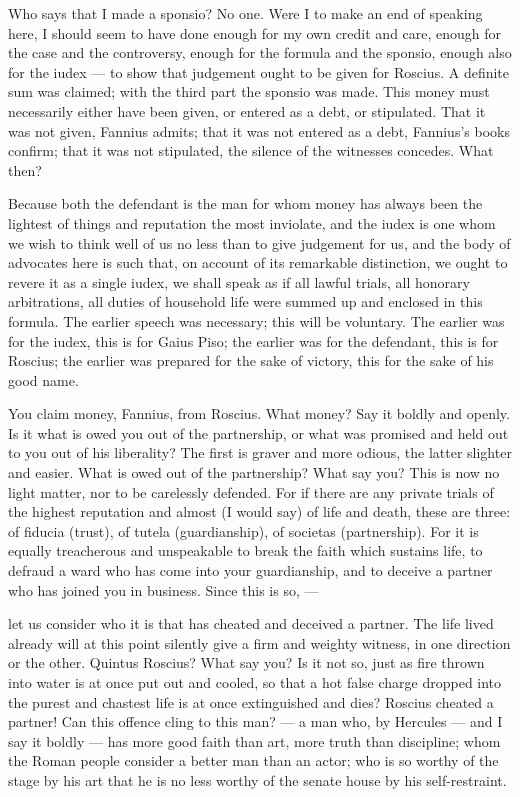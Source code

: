  Who says that I made a sponsio? No one. Were I to make an end of speaking here, I should seem to have done enough for my own credit and care, enough for the case and the controversy, enough for the formula and the sponsio, enough also for the iudex --- to show that judgement ought to be given for Roscius. A definite sum was claimed; with the third part the sponsio was made. This money must necessarily either have been given, or entered as a debt, or stipulated. That it was not given, Fannius admits; that it was not entered as a debt, Fannius's books confirm; that it was not stipulated, the silence of the witnesses concedes. What then?

 Because both the defendant is the man for whom money has always been the lightest of things and reputation the most inviolate, and the iudex is one whom we wish to think well of us no less than to give judgement for us, and the body of advocates here is such that, on account of its remarkable distinction, we ought to revere it as a single iudex, we shall speak as if all lawful trials, all honorary arbitrations, all duties of household life were summed up and enclosed in this formula. The earlier speech was necessary; this will be voluntary. The earlier was for the iudex, this is for Gaius Piso; the earlier was for the defendant, this is for Roscius; the earlier was prepared for the sake of victory, this for the sake of his good name.

 You claim money, Fannius, from Roscius. What money? Say it boldly and openly. Is it what is owed you out of the partnership, or what was promised and held out to you out of his liberality? The first is graver and more odious, the latter slighter and easier. What is owed out of the partnership? What say you? This is now no light matter, nor to be carelessly defended. For if there are any private trials of the highest reputation and almost (I would say) of life and death, these are three: of fiducia (trust), of tutela (guardianship), of societas (partnership). For it is equally treacherous and unspeakable to break the faith which sustains life, to defraud a ward who has come into your guardianship, and to deceive a partner who has joined you in business. Since this is so, ---

 let us consider who it is that has cheated and deceived a partner. The life lived already will at this point silently give a firm and weighty witness, in one direction or the other. Quintus Roscius? What say you? Is it not so, just as fire thrown into water is at once put out and cooled, so that a hot false charge dropped into the purest and chastest life is at once extinguished and dies? Roscius cheated a partner! Can this offence cling to this man? --- a man who, by Hercules --- and I say it boldly --- has more good faith than art, more truth than discipline; whom the Roman people consider a better man than an actor; who is so worthy of the stage by his art that he is no less worthy of the senate house by his self-restraint.


